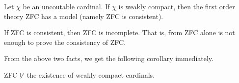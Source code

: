 \begin{theorem}[ZFC]
    Let $\chi$ be an uncoutable cardinal. If $\chi$ is weakly compact, then the first order theory ZFC has a model (namely ZFC is consistent).
\end{theorem}

\begin{theorem}
    If ZFC is consistent, then ZFC is incomplete. That is, from ZFC alone is not enough to prove the consistency of ZFC.
\end{theorem}

From the above two facts, we get the following corollary immediately.
\begin{corollary}
    ZFC $\not\vdash$ the existence of weakly compact cardinals.
\end{corollary}
